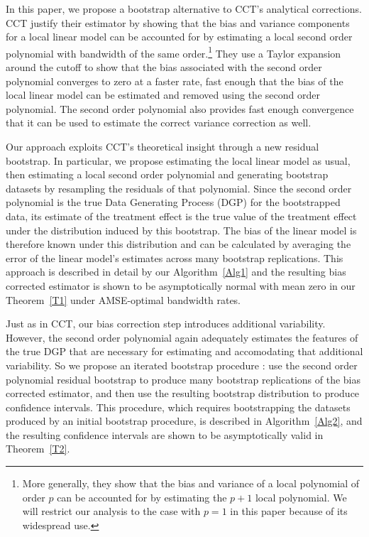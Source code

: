 \documentclass[12pt,fleqn]{article}
\begin{document}
In this paper, we propose a bootstrap alternative to CCT's analytical
corrections. CCT justify their estimator by showing that the bias and variance
components for a local linear model can be accounted for by estimating a local
second order polynomial with bandwidth of the same order.\footnote{%
  More generally, they show that the bias and variance of a local polynomial of
  order $p$ can be accounted for by estimating the $p+1$ local polynomial. We
  will restrict our analysis to the case with $p = 1$ in this paper because
  of its widespread use.} %
They use a Taylor expansion around the cutoff to show that the bias associated
with the second order polynomial converges to zero at a faster rate, fast
enough that the bias of the local linear model can be estimated and removed
using the second order polynomial. The second order polynomial also provides
fast enough convergence that it can be used to estimate the correct variance
correction as well.

Our approach exploits CCT's theoretical insight through a new residual
bootstrap. In particular, we propose estimating the local linear model as usual,
then estimating a local second order polynomial and generating bootstrap
datasets by resampling the residuals of that polynomial. Since the second order
polynomial is the true Data Generating Process (DGP) for the bootstrapped data,
its estimate of the treatment effect is the true value of the treatment effect
under the distribution induced by this bootstrap. The bias of the linear model
is therefore known
under this distribution and can be calculated by averaging the error of the
linear model's estimates across many bootstrap replications. This approach is
described in detail by our Algorithm~\ref{Alg1} and the resulting bias corrected
estimator is shown to be asymptotically normal with mean zero in our
Theorem~\ref{T1} under AMSE-optimal bandwidth rates.

Just as in CCT, our bias correction step introduces additional
variability. However, the second order polynomial again adequately estimates the
features of the true DGP that are necessary for estimating and accomodating that
additional variability. So we propose
an iterated bootstrap procedure \citep{hall1988}: use the second order
polynomial residual bootstrap to produce many bootstrap replications of the bias
corrected estimator, and then use the resulting bootstrap distribution to
produce confidence intervals. This procedure, which requires bootstrapping the
datasets produced by an initial bootstrap procedure, is described in Algorithm~\ref{Alg2}, and the resulting confidence intervals are shown to be asymptotically valid in Theorem~\ref{T2}.
\end{document}
